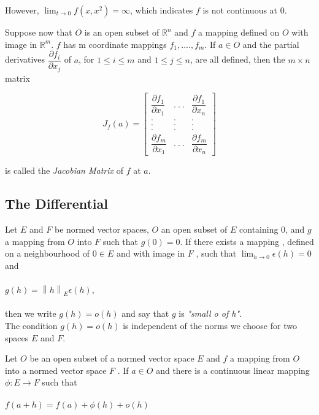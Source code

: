 \documentclass[11 pt]{article}
\theoremstyle{definition}
\theoremstyle{remark}
\newcommand{\R}{\mathbb{R}}
\newcommand\norm[1]{\left\lVert#1\right\rVert}
\begin{document}
However, $\lim_{t \to 0}f(x,x^2) = \infty $, which indicates $f$ is not continuous at 0. \\ \normalfont

Suppose now that $O$ is an open subset of $\R^n$ and $f$ a mapping defined on $O$ with image in $\R^m$. $f$ has m coordinate mappings $f_1,...., f_m$. If $a \in O$ and the partial derivatives $\dfrac{\partial f_i}{\partial x_j} $ of $a$, for $1 \leq i \leq m$ and $1 \leq j \leq n$, are all defined, then the $m \times n $ matrix

\begin{center}
\[
J_f (a)=
  \begin{bmatrix}
    \dfrac{\partial f_1}{\partial x_1} & . ~ . ~ . & \dfrac{\partial f_1}{\partial x_n}  \\
    . & . & . \\
    . & . & . \\
    . & . & . \\
    \dfrac{\partial f_m}{\partial x_1} & . ~ . ~ . & \dfrac{\partial f_m}{\partial x_n} 
  \end{bmatrix}
\]
\end{center}

is called the \textit{Jacobian Matrix} of $f$ at $a$.\\


\subsection{The Differential}

Let $E$ and $F$ be normed vector spaces, $O$ an open subset of $E$ containing 0, and $g$ a mapping from $O$ into $F$ such that $g(0) =  0$. If there exists a mapping \epsilon, defined on a neighbourhood of $0 \in E$ and with image in $F$ , such that $\lim_{h \to 0} \epsilon(h) = 0$ and \\~\\
\hspace*{2cm} $g(h) = \norm{h}_E \epsilon(h)$,\\~\\
then we write $g(h) = o(h)$ and say that $g$ is \textit{"small o of h"}. \\

The condition $g(h) = o(h)$ is independent of the norms we choose for two spaces $E$ and $F$. \\
\par 
Let $O$ be an open subset of a normed vector space $E$ and $f$ a mapping from $O$
into a normed vector space $F$ . If $a \in O$ and there is a continuous linear mapping $\phi : E \rightarrow F$ such that \\~\\
\hspace*{1cm} $ f(a+h) = f(a) + \phi (h) + o(h) $ \\
\end{document}
